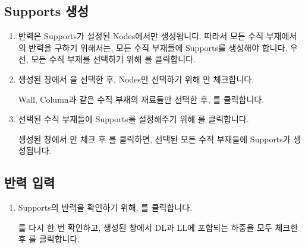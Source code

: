 \documentclass[a4paper,11pt,korean,openany,oneside]{sphinxmanual}
\begin{document}
\subsection{Supports 생성}
\label{\detokenize{2_nodal_loads:supports}}
\begin{sphinxShadowBox}
\begin{enumerate}
%
\item {} 
\sphinxAtStartPar
반력은 Supports가 설정된 Nodes에서만 생성됩니다.
따라서 모든 수직 부재에서의 반력을 구하기 위해서는, 모든 수직 부재들에 Supports를 생성해야 합니다.
우선, 모든 수직 부재를 선택하기 위해 를 클릭합니다.

\item {} 
\sphinxAtStartPar
생성된 창에서  \sphinxhyphen{} 을 선택한 후, Nodes만 선택하기 위해 만 체크합니다.

\sphinxAtStartPar
Wall, Column과 같은 수직 부재의 재료들만 선택한 후,  \sphinxhyphen{} 를 클릭합니다.

\item {} 
\sphinxAtStartPar
선택된 수직 부재들에 Supports를 설정해주기 위해  \sphinxhyphen{} 를 클릭합니다.

\sphinxAtStartPar
생성된 창에서 만 체크 후 를 클릭하면, 선택된 모든 수직 부재들에 Supports가 생성됩니다.

\end{enumerate}
\end{sphinxShadowBox}


\subsection{반력 입력}
\label{\detokenize{2_nodal_loads:id1}}\begin{enumerate}
%
\item {} 
\sphinxAtStartPar
Supports의 반력을 확인하기 위해,  \sphinxhyphen{}  \sphinxhyphen{} 를 클릭합니다.

\sphinxAtStartPar
{\hyperref[\detokenize{2_etc::doc}]{}}를 다시 한 번 확인하고, 생성된 창에서 DL과 LL에 포함되는 하중을 모두 체크한 후 를 클릭합니다.

\end{enumerate}
\end{document}
